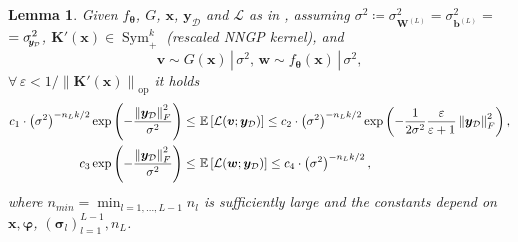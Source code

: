 \documentclass[a4paper, 11pt, reqno]{amsart}
\theoremstyle{plain}
\newtheorem{lemma}[theorem]{Lemma}
\theoremstyle{remark}
\theoremstyle{definition}
\newcommand{\mean}[2][\kern-0.5pt]{\mathbb{E}_{#1}\left[#2\right]}
\newcommand{\given}{\, | \,}
\newcommand{\norm}[1]{\left\lVert#1\right\rVert}
\renewcommand{\exp}[1]{\operatorname{exp}\left(#1\right)}
\let\epsilon\varepsilon
\let\oldforall\forall
\renewcommand{\forall}{\oldforall\,}
\newcommand{\setmuskip}[1]{%
    \thinmuskip = #1\thinmuskip
    \medmuskip = #1\thinmuskip
    \thickmuskip = #1\thinmuskip}
\newcommand{\sigmay}{\sigma_{\scalebox{0.65}{$\kern-3pt\bm{y}_{\mathcal{D}}$}}}%
\begin{document}
\begin{lemma} \label{lem:boundexplikelihood}
	Given $f_{\bm{\theta}}$, $G$, $\bm{x}$, $\bm{y}_{\mathcal{D}}$ and $\mathcal{L}$ as in , assuming $\sigma^2 \coloneqq \sigma_{\bm{W}^{(L)}}^2 = \sigma_{\bm{b}^{(L)}}^2 =$ $= \sigmay^2$, $\bm{K}'(\bm{x}) \in \operatorname{Sym}_+^{k}$ (rescaled NNGP kernel), and 
	\begin{equation*}
		\bm{v} \sim G(\bm{x}) \given \sigma^2, \, \bm{w} \sim f_{\bm{\theta}}(\bm{x}) \given \sigma^2,
	\end{equation*}
	$\forall \epsilon < 1/\norm{\bm{K}'(\bm{x})}_{\mathrm{op}}$ it holds
	\begin{equation*}
		\begin{aligned}
			c_1 \cdot \left(\sigma^2\right)^{- n_L k / 2} \exp{-\frac{\norm{\bm{y}_{\mathcal{D}}}_F^2}{\sigma^2}} \leq \ & \mean{\mathcal{L}(\bm{v}; \bm{y}_{\mathcal{D}})} \leq c_2 \cdot \left(\sigma^2\right)^{- n_L k / 2} \exp{-\frac{1}{2 \sigma^2} \frac{\epsilon}{\epsilon + 1} \norm{\bm{y}_{\mathcal{D}}}_F^2}, \\
			c_3 \exp{-\frac{\norm{\bm{y}_{\mathcal{D}}}_F^2}{\sigma^2}} \leq \ & \mean{\mathcal{L}(\bm{w}; \bm{y}_{\mathcal{D}})} \leq c_4 \cdot \left(\sigma^2\right)^{- n_L k / 2},
		\end{aligned}
	\end{equation*}
	where $n_{min} = \min_{l = 1, \dots, L - 1} n_l$ is sufficiently large and the constants depend on $\bm{x}, \bm{\varphi}$, $\left(\bm{\sigma}_l\right)_{l = 1}^{L - 1}, n_L$.
\end{lemma}
\end{document}
